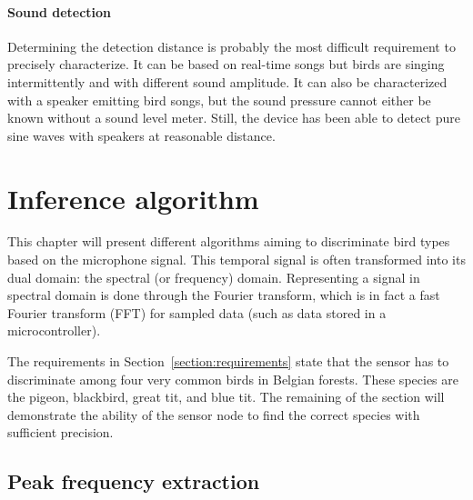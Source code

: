\documentclass{EPL-master-thesis-covers-EN}
\begin{document}
\subsubsection*{Sound detection}

Determining the detection distance is probably the most difficult requirement to precisely characterize. It can be based on real-time songs but birds are singing intermittently and with different sound amplitude. It can also be characterized with a speaker emitting bird songs, but the sound pressure cannot either be known without a sound level meter. Still, the device has been able to detect pure sine waves with speakers at reasonable distance.

    
\chapter{Inference algorithm}

This chapter will present different algorithms aiming to discriminate bird types based on the microphone signal. This temporal signal is often transformed into its dual domain: the spectral (or frequency) domain. Representing a signal in spectral domain is done through the Fourier transform, which is in fact a fast Fourier transform (FFT) for sampled data (such as data stored in a microcontroller).

The requirements in Section~\ref{section:requirements} state that the sensor has to discriminate among four very common birds in Belgian forests. These species are the pigeon, blackbird, great tit, and blue tit. The remaining of the section will demonstrate the ability of the sensor node to find the correct species with sufficient precision.

\section{Peak frequency extraction}
\end{document}
